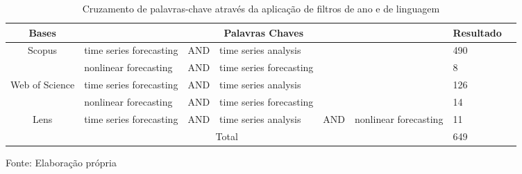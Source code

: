 \begin{table}[!ht]
	\caption{Cruzamento de palavras-chave através da aplicação de filtros de ano e de linguagem}\label{tb1}
	\centering
	\begin{tabular}{@{}cp{2cm}p{1cm}p{2cm}p{1cm}p{2cm}p{2cm}p{2cm}@{}}
		\toprule
		Bases                             & \multicolumn{5}{c}{Palavras Chaves}                                                         & Resultado \\ \midrule
		\multirow{2}{*}{Scopus}           & time   series forecasting & AND & time   series analysis    &     &                         & 490       \\
		& nonlinear forecasting     & AND & time   series forecasting &     &                         & 8         \\
		\multirow{2}{*}{Web   of Science} & time   series forecasting & AND & time   series analysis    &     &                         & 126       \\
		& nonlinear forecasting     & AND & time   series forecasting &     &                         & 14        \\
		Lens                              & time   series forecasting & AND & time   series analysis    & AND & nonlinear   forecasting & 11        \\
		\multicolumn{6}{c}{Total}                                                                                                       & 649       \\ \bottomrule
	\end{tabular}
	
	
	\vspace{0.2cm}
	Fonte: Elaboração própria
\end{table}